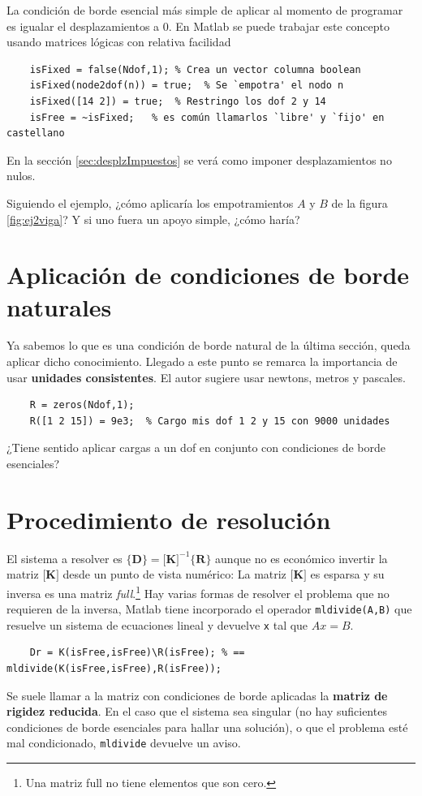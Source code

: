 \documentclass[11pt, a4paper,titlepage]{article}
\newcommand{\rmfont}[1]{{\fontfamily{ptm}\selectfont%
#1}}
\newcommand{\Matlab}{\rmfont{\sc Matlab}}
\newcommand{\Mme}[1]{\boldsymbol{[}\mathbf{#1} \boldsymbol{]}}
\newcommand{\Cme}[1]{\boldsymbol{\{ }\mathbf{#1} \boldsymbol{\}} }
\newcommand{\CD}{\Cme{D}}
\newcommand{\MK}{\Mme{K}}
\newcommand{\CR}{\Cme{R}}
\begin{document}
La condición de borde esencial más simple de aplicar al momento de programar es igualar el desplazamientos a 0. En \Matlab{} se puede trabajar este concepto usando matrices lógicas con relativa facilidad
\begin{verbatim}
    isFixed = false(Ndof,1); % Crea un vector columna boolean
    isFixed(node2dof(n)) = true;  % Se `empotra' el nodo n
    isFixed([14 2]) = true;  % Restringo los dof 2 y 14
    isFree = ~isFixed;   % es común llamarlos `libre' y `fijo' en castellano
\end{verbatim}
En la sección \ref{sec:desplzImpuestos} se verá como imponer desplazamientos no nulos.

Siguiendo el ejemplo, ¿cómo aplicaría los empotramientos $A$ y $B$ de la figura \ref{fig:ej2viga}? Y si uno fuera un apoyo simple, ¿cómo haría? 



\section{Aplicación de condiciones de borde naturales}
Ya sabemos lo que es una condición de borde natural de la última sección, queda aplicar dicho conocimiento. Llegado a este punto se remarca la importancia de usar \textbf{unidades consistentes}. El autor sugiere usar newtons, metros y pascales.  

\begin{verbatim}
    R = zeros(Ndof,1);
    R([1 2 15]) = 9e3;  % Cargo mis dof 1 2 y 15 con 9000 unidades
\end{verbatim}

¿Tiene sentido aplicar cargas a un dof en conjunto con condiciones de borde esenciales?

\section{Procedimiento de resolución}
El sistema a resolver es $\CD=\MK^{-1}\CR$ aunque no es económico invertir la matriz $\MK$ desde un punto de vista numérico: La matriz $\MK$ es esparsa y su inversa es una matriz \textit{full}.\footnote{Una matriz full no tiene elementos que son cero.} Hay varias formas de resolver el problema que no requieren de la inversa, \Matlab{} tiene incorporado el operador \texttt{mldivide(A,B)} que resuelve un sistema de ecuaciones lineal y devuelve \texttt{x} tal que $Ax=B$. 

\begin{verbatim}
    Dr = K(isFree,isFree)\R(isFree); % == mldivide(K(isFree,isFree),R(isFree));
\end{verbatim}
Se suele llamar a la matriz con condiciones de borde aplicadas la \textbf{matriz de rigidez reducida}. En el caso que el sistema sea singular (no hay suficientes condiciones de borde esenciales para hallar una solución), o que el problema esté mal condicionado, \texttt{mldivide} devuelve un aviso.  
\end{document}
